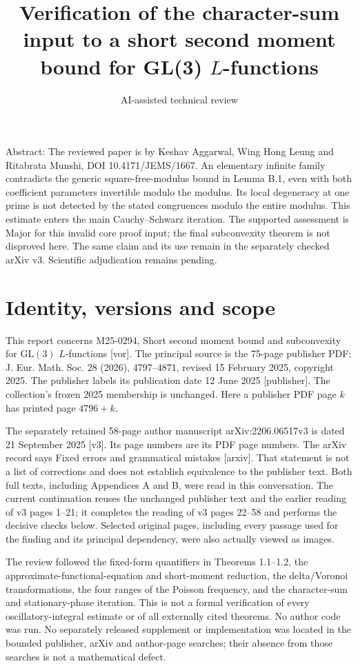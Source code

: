 \documentclass[10pt]{article}
\title{Verification of the character-sum input to
a short second moment bound for GL(3) \(L\)-functions}
\author{AI-assisted technical review}
\date{}
\begin{document}
\maketitle
Abstract: The reviewed paper is by Keshav Aggarwal, Wing Hong Leung and Ritabrata Munshi, DOI 10.4171/JEMS/1667. An elementary infinite family contradicts the generic square-free-modulus bound in Lemma B.1, even with both coefficient parameters invertible modulo the modulus. Its local degeneracy at one prime is not detected by the stated congruences modulo the entire modulus. This estimate enters the main Cauchy–Schwarz iteration. The supported assessment is Major for this invalid core proof input; the final subconvexity theorem is not disproved here. The same claim and its use remain in the separately checked arXiv v3. Scientific adjudication remains pending.\par
\section*{Identity, versions and scope}
This report concerns M25-0294, Short second moment bound and subconvexity for \(\mathrm{GL}(3)\) \(L\)-functions [vor]. The principal source is the 75-page publisher PDF: J. Eur. Math. Soc. 28 (2026), 4797–4871, revised 15 February 2025, copyright 2025. The publisher labels its publication date 12 June 2025 [publisher]. The collection’s frozen 2025 membership is unchanged. Here a publisher PDF page \(k\) has printed page \(4796+k\).\par
The separately retained 58-page author manuscript arXiv:2206.06517v3 is dated 21 September 2025 [v3]. Its page numbers are its PDF page numbers. The arXiv record says Fixed errors and grammatical mistakes [arxiv]. That statement is not a list of corrections and does not establish equivalence to the publisher text. Both full texts, including Appendices A and B, were read in this conversation. The current continuation reuses the unchanged publisher text and the earlier reading of v3 pages 1–21; it completes the reading of v3 pages 22–58 and performs the decisive checks below. Selected original pages, including every passage used for the finding and its principal dependency, were also actually viewed as images.\par
The review followed the fixed-form quantifiers in Theorems 1.1–1.2, the approximate-functional-equation and short-moment reduction, the delta/Voronoi transformations, the four ranges of the Poisson frequency, and the character-sum and stationary-phase iteration. This is not a formal verification of every oscillatory-integral estimate or of all externally cited theorems. No author code was run. No separately released supplement or implementation was located in the bounded publisher, arXiv and author-page searches; their absence from those searches is not a mathematical defect.\par
\end{document}
